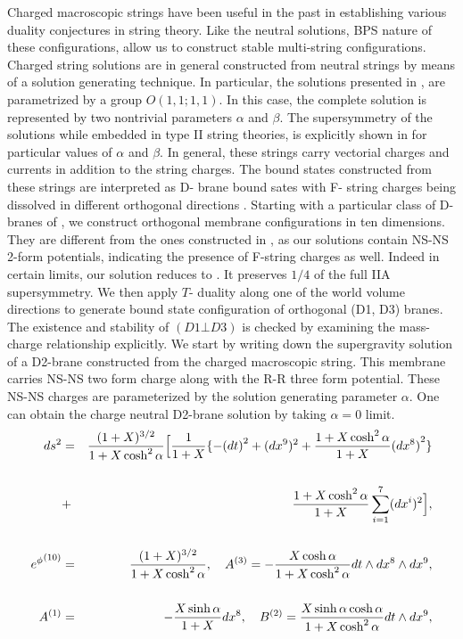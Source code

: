 \documentclass[a4paper,12pt,fleqn,cite,epsfig]{article}
\begin{document}
Charged macroscopic strings have been useful in the past in establishing
various duality conjectures in string theory. Like the neutral
solutions, BPS nature of these configurations, allow us to construct stable
multi-string configurations. Charged string solutions are in general 
constructed from neutral strings by means of a solution generating
technique. In particular, the solutions presented in \cite{sen},
are parametrized by a group $O(1,1; 1,1)$. In this case, the complete solution 
is represented by two nontrivial parameters $\alpha$ and $\beta$.
The supersymmetry of the solutions while embedded in type II string 
theories, is explicitly shown in \cite{kumar} for particular values of
$\alpha$ and $\beta$.
In general, these strings carry vectorial charges and currents
in addition to the string charges. The bound states constructed 
from these strings are interpreted as D- brane bound sates with
F- string charges being dissolved in different orthogonal 
directions \cite{kamal}.  
Starting with a particular class of D-branes of \cite{kamal}, we construct 
orthogonal membrane configurations in ten dimensions. They are
different from the ones constructed in \cite{myers1,hambli}, 
as our solutions contain NS-NS
2-form potentials, indicating the presence of F-string charges as well. 
Indeed in certain limits, our solution reduces to
\cite{myers1,hambli}. It preserves $1/4$ of the full IIA supersymmetry.
We then apply $T$- duality along one of the world volume directions to
generate bound state configuration of orthogonal (D1, D3) branes.
The existence and stability of $(D1 \bot D3)$ is checked by
examining the mass-charge relationship explicitly.
We start by writing down the supergravity solution of a D2-brane
constructed from the charged macroscopic string\cite{kamal}. 
This membrane carries NS-NS two form charge along with the R-R 
three form potential. 
These NS-NS charges are parameterized by the 
solution generating parameter $\alpha$. One can obtain the 
charge neutral D2-brane solution\cite{kastor,duff} by taking $\alpha = 0$
limit.  
\begin{eqnarray}
ds^2 &=& {(1 + X)^{3/2}\over {1 + X \cosh^2 \alpha}}\Big[{1\over {1 +
X}}\{ -{(dt)}^2 + {(dx^9)^2} + {{1 + X \cosh^2 \alpha}\over {1 + X}}
{(dx^8)}^2\} \cr
& \cr
&+& {{1 + X \cosh^2 \alpha}\over {1 + X}}
\sum_{i=1}^{7} ({dx^i})^2\Big],\cr
& \cr
{e^{\phi}}^{(10)} &=& {(1 + X)^{3/2}\over {1 + X \cosh^2 \alpha}},~~~
A^{(3)} = - {X \cosh \alpha\over{1 + X \cosh^2\alpha}}dt \wedge dx^8
\wedge dx^9,\cr
& \cr
A^{(1)} &=& - {X \sinh\alpha\over{1 + X}}dx^8,~~~
B^{(2)} = {X \sinh\alpha\cosh\alpha\over{1 + X\cosh^2\alpha}}dt \wedge dx^9,
\label{d2}
\end{eqnarray}
\end{document}
